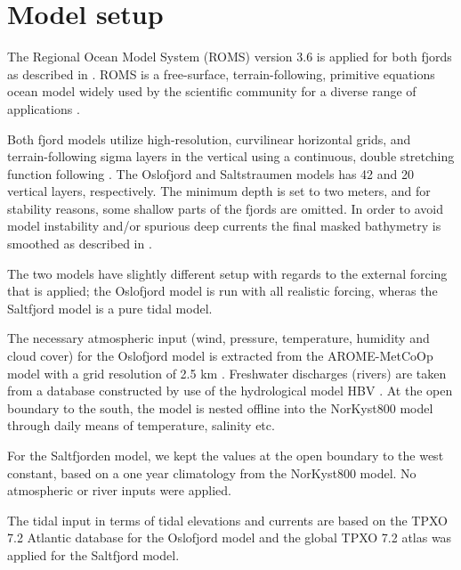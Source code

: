 \section{Model setup}

The Regional Ocean Model System (ROMS) version 3.6 is applied for both fjords as described in \cite{roed16}. ROMS is a free-surface, terrain-following, primitive equations ocean model widely used by the scientific community for a diverse range of applications \cite[]{shchepetkin05,shchepetkin09,haidvogel08}. 

Both fjord models utilize high-resolution, curvilinear horizontal grids, and terrain-following sigma layers in the vertical using a continuous, double stretching function following \cite{shchepetkin09}. The Oslofjord and Saltstraumen models has 42 and 20 vertical layers, respectively. The minimum depth is set to two meters, and for stability reasons, some shallow parts of the fjords are omitted. In order to avoid model instability and/or spurious deep currents the final masked bathymetry is smoothed as described in \cite{roed16}.



The two models have slightly different setup with regards to the external forcing that is applied; the Oslofjord model is run with all realistic forcing, wheras the Saltfjord model is a pure tidal model. 

The necessary atmospheric input (wind, pressure, temperature, humidity and cloud cover) for the Oslofjord model is extracted from the AROME-MetCoOp model with a grid resolution of 2.5 km \cite[]{muller2015}. Freshwater discharges (rivers) are taken from a database constructed by use of the hydrological model HBV \cite[]{beldring2003}. At the open boundary to the south, the model is nested offline into the NorKyst800 model \cite[]{albretsen11} through daily means of temperature, salinity etc.

For the Saltfjorden model, we kept the values at the open boundary to the west constant, based on a one year climatology from the NorKyst800 model. No atmospheric or river inputs were applied.

The tidal input in terms of tidal elevations and currents are based on the TPXO 7.2 Atlantic database \cite[]{egbert02} for the Oslofjord model and the global TPXO 7.2 atlas was applied for the Saltfjord model. 
